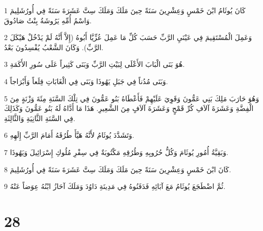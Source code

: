 \par 1 كَانَ يُوثَامُ ابْنَ خَمْسٍ وَعِشْرِينَ سَنَةً حِينَ مَلَكَ وَمَلَكَ سِتَّ عَشَرَةَ سَنَةً فِي أُورُشَلِيمَ وَاسْمُ أُمِّهِ يَرُوشَةُ بِنْتُ صَادُوقَ.
\par 2 وَعَمِلَ الْمُسْتَقِيمَ فِي عَيْنَيِ الرَّبِّ حَسَبَ كُلِّ مَا عَمِلَ عُزِّيَّا أَبُوهُ (إِلاَّ أَنَّهُ لَمْ يَدْخُلْ هَيْكَلَ الرَّبِّ). وَكَانَ الشَّعْبُ يُفْسِدُونَ بَعْدُ.
\par 3 هُوَ بَنَى الْبَابَ الأَعْلَى لِبَيْتِ الرَّبِّ وَبَنَى كَثِيراً عَلَى سُورِ الأَكَمَةِ.
\par 4 وَبَنَى مُدُناً فِي جَبَلِ يَهُوذَا وَبَنَى فِي الْغَابَاتِ قِلَعاً وَأَبْرَاجاً.
\par 5 وَهُوَ حَارَبَ مَلِكَ بَنِي عَمُّونَ وَقَوِيَ عَلَيْهِمْ فَأَعْطَاهُ بَنُو عَمُّونَ فِي تِلْكَ السَّنَةِ مِئَةَ وَزْنَةٍ مِنَ الْفِضَّةِ وَعَشَرَةَ آلاَفِ كُرِّ قَمْحٍ وَعَشَرَةَ آلاَفٍ مِنَ الشَّعِيرِ. هَذَا مَا أَدَّاهُ لَهُ بَنُو عَمُّونَ وَكَذَلِكَ فِي السَّنَةِ الثَّانِيَةِ وَالثَّالِثَةِ.
\par 6 وَتَشَدَّدَ يُوثَامُ لأَنَّهُ هَيَّأَ طُرُقَهُ أَمَامَ الرَّبِّ إِلَهِهِ.
\par 7 وَبَقِيَّةُ أُمُورِ يُوثَامَ وَكُلُّ حُرُوبِهِ وَطُرُقِهِ مَكْتُوبَةٌ فِي سِفْرِ مُلُوكِ إِسْرَائِيلَ وَيَهُوذَا.
\par 8 كَانَ ابْنَ خَمْسٍ وَعِشْرِينَ سَنَةً حِينَ مَلَكَ وَمَلَكَ سِتَّ عَشَرَةَ سَنَةً فِي أُورُشَلِيمَ.
\par 9 ثُمَّ اضْطَجَعَ يُوثَامُ مَعَ آبَائِهِ فَدَفَنُوهُ فِي مَدِينَةِ دَاوُدَ وَمَلَكَ آحَازُ ابْنُهُ عِوَضاً عَنْهُ.

\chapter{28}

